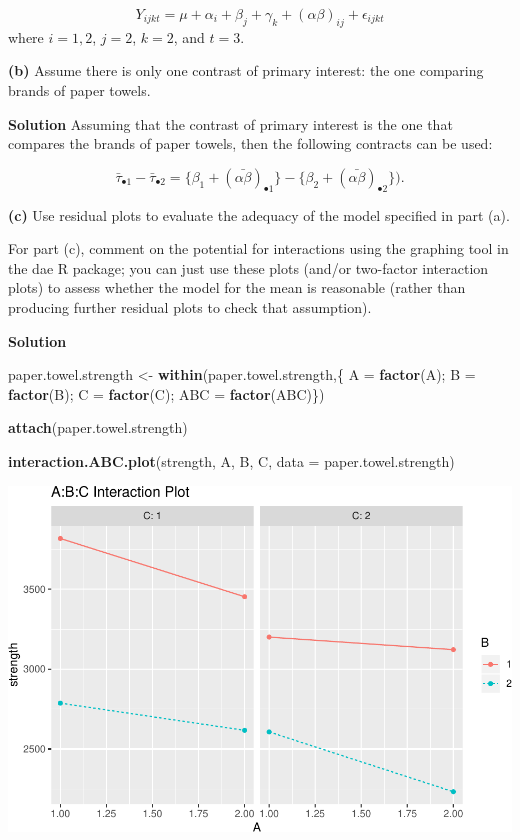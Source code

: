 \documentclass[12pt,]{article}
\newenvironment{Shaded}{\begin{snugshade}}{\end{snugshade}}
\newcommand{\KeywordTok}[1]{\textcolor[rgb]{0.13,0.29,0.53}{\textbf{#1}}}
\newcommand{\DataTypeTok}[1]{\textcolor[rgb]{0.13,0.29,0.53}{#1}}
\newcommand{\StringTok}[1]{\textcolor[rgb]{0.31,0.60,0.02}{#1}}
\newcommand{\NormalTok}[1]{#1}
\begin{document}
\[
Y_{ijk t} = \mu + \alpha_i + \beta_j + \gamma_k + (\alpha \beta)_{ij} + \epsilon_{ijk t}
\] where \(i = 1, 2\), \(j = 2\), \(k= 2\), and \(t=3\).

\textbf{(b)} Assume there is only one contrast of primary interest: the
one comparing brands of paper towels.

\textbf{Solution} Assuming that the contrast of primary interest is the
one that compares the brands of paper towels, then the following
contracts can be used:

\[
\bar{\tau}_{\bullet 1} - \bar{\tau}_{\bullet 2} = \{\beta_1 + (\bar{\alpha \beta})_{\bullet 1} \} - \{\beta_2 + (\bar{\alpha \beta})_{\bullet 2} \}).
\]

\textbf{(c)} Use residual plots to evaluate the adequacy of the model
specified in part (a).

For part (c), comment on the potential for interactions using the
graphing tool in the dae R package; you can just use these plots (and/or
two-factor interaction plots) to assess whether the model for the mean
is reasonable (rather than producing further residual plots to check
that assumption).

\textbf{Solution}

\begin{Shaded}
\begin{Highlighting}[]
\NormalTok{paper.towel.strength <-}\StringTok{ }\KeywordTok{within}\NormalTok{(paper.towel.strength,\{}
\NormalTok{  A =}\StringTok{ }\KeywordTok{factor}\NormalTok{(A); B =}\StringTok{ }\KeywordTok{factor}\NormalTok{(B); C =}\StringTok{ }\KeywordTok{factor}\NormalTok{(C); ABC =}\StringTok{ }\KeywordTok{factor}\NormalTok{(ABC)\})}




\KeywordTok{attach}\NormalTok{(paper.towel.strength)}

\KeywordTok{interaction.ABC.plot}\NormalTok{(strength, A, B, C, }\DataTypeTok{data =}\NormalTok{ paper.towel.strength)}
\end{Highlighting}
\end{Shaded}

\includegraphics{Markdown_HW_7_files/figure-latex/unnamed-chunk-2-1.pdf}
\end{document}
